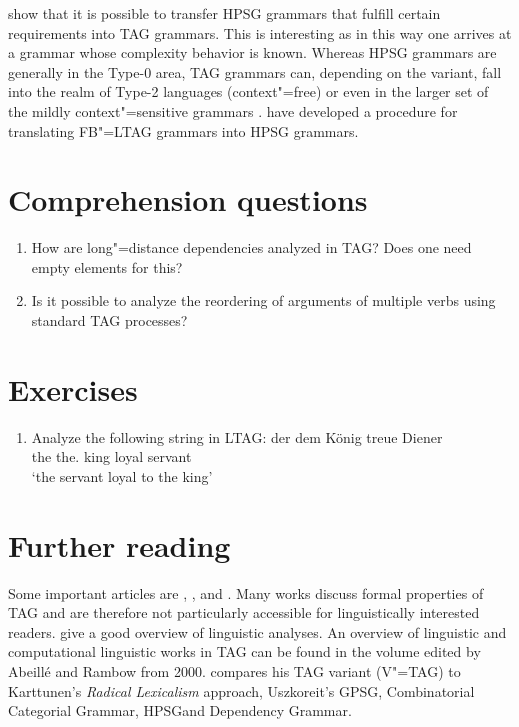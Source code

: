 \citet*{KKNV95a} show that it is possible to transfer HPSG grammars that fulfill certain requirements into TAG grammars. This is interesting
as in this way one arrives at a grammar whose complexity behavior is known. Whereas HPSG grammars are generally
in the Type-0 area, TAG grammars can, depending on the variant, fall into the realm of Type-2 languages (context"=free) or even in the
larger set of the mildly context"=sensitive grammars \citep{Joshi85a-u}. \citet*{YMTT2001a} have developed a procedure for translating FB"=LTAG grammars into
HPSG grammars.


\section*{Comprehension questions}

\begin{enumerate}
\item How are long"=distance dependencies analyzed in TAG? Does one need empty elements for this?
\item Is it possible to analyze the reordering of arguments of multiple verbs using standard TAG processes?
\end{enumerate} 

\section*{Exercises}

\begin{enumerate}
\item Analyze the following string in LTAG:
\ea
\gll der dem König treue Diener\\
	 the the.\dat{} king loyal servant\\
\glt `the servant loyal to the king'
\z
\end{enumerate}

\section*{Further reading}

Some important articles are , , and . Many works discuss formal properties of TAG and are therefore not particularly accessible for
linguistically interested readers.  give a good overview of linguistic analyses. An overview of linguistic and computational linguistic
works in TAG can be found in the volume edited by Abeill{\'e} and
Rambow\nocite{AR2000a-ed} from 2000. \citet{Rambow94a} compares his TAG variant (V"=TAG) to Karttunen's \emph{Radical Lexicalism} approach, Uszkoreit's GPSG\indexgpsg,
Combinatorial Categorial Grammar\indexcg, HPSG\indexhpsg and
Dependency Grammar\indexdg. 

